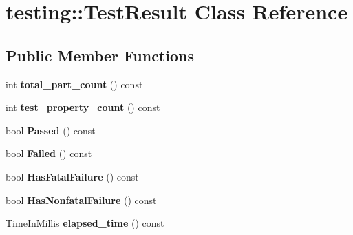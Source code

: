 \hypertarget{classtesting_1_1_test_result}{}\section{testing\+:\+:Test\+Result Class Reference}
\label{classtesting_1_1_test_result}
\subsection*{Public Member Functions}
\begin{DoxyCompactItemize}
\item 
\hypertarget{classtesting_1_1_test_result_ae6a378ec743edfbed55890c955d0adc8}{}int {\bfseries total\+\_\+part\+\_\+count} () const \label{classtesting_1_1_test_result_ae6a378ec743edfbed55890c955d0adc8}

\item 
\hypertarget{classtesting_1_1_test_result_a5075f9d595d51c7cc2f5c0921e622831}{}int {\bfseries test\+\_\+property\+\_\+count} () const \label{classtesting_1_1_test_result_a5075f9d595d51c7cc2f5c0921e622831}

\item 
\hypertarget{classtesting_1_1_test_result_aa46a04342f02ec297357f47288da3ef3}{}bool {\bfseries Passed} () const \label{classtesting_1_1_test_result_aa46a04342f02ec297357f47288da3ef3}

\item 
\hypertarget{classtesting_1_1_test_result_abb5d051bf958071c14020132a4d6cc07}{}bool {\bfseries Failed} () const \label{classtesting_1_1_test_result_abb5d051bf958071c14020132a4d6cc07}

\item 
\hypertarget{classtesting_1_1_test_result_ace61ce992083a9124f9ff0e99a2041cc}{}bool {\bfseries Has\+Fatal\+Failure} () const \label{classtesting_1_1_test_result_ace61ce992083a9124f9ff0e99a2041cc}

\item 
\hypertarget{classtesting_1_1_test_result_a34e6901b9772f51ce4f17a5517c26607}{}bool {\bfseries Has\+Nonfatal\+Failure} () const \label{classtesting_1_1_test_result_a34e6901b9772f51ce4f17a5517c26607}

\item 
\hypertarget{classtesting_1_1_test_result_a582f6383265d0619df812b75499d0616}{}Time\+In\+Millis {\bfseries elapsed\+\_\+time} () const \label{classtesting_1_1_test_result_a582f6383265d0619df812b75499d0616}


\end{DoxyCompactItemize}

